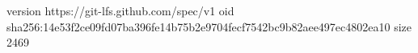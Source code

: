 version https://git-lfs.github.com/spec/v1
oid sha256:14e53f2ce09fd07ba396fe14b75b2e9704fecf7542bc9b82aee497ec4802ea10
size 2469
